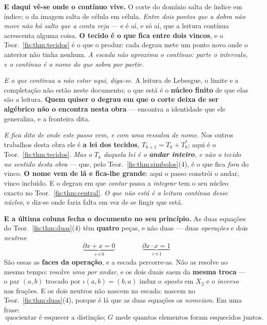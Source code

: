\documentclass[livro.tex]{subfiles}
\begin{document}
\medskip\noindent\textbf{E daqui vê-se onde o contínuo vive.} O corte do domínio
salta de índice em índice; o da imagem salta de célula em célula. \emph{Entre
dois pontos que a dobra não move não há salto que a conta veja} --- e é aí, e só
aí, que a leitura contínua acrescenta alguma coisa. \textbf{O tecido é o que fica
entre dois vincos}, e o Teor.~\ref{fis:thm:tecidos} é o que o produz: cada degrau
mete um ponto novo onde o anterior não tinha nenhum. \emph{A escada não aproxima
o contínuo: parte o intervalo, e o contínuo é o nome do que sobra por partir.}

\medskip\noindent\emph{E o que continua a não estar aqui, diga-se.} A leitura de
Lebesgue, o limite e a completação não estão neste documento; o que está é o
\textbf{núcleo finito} de que elas são a leitura. \textbf{Quem quiser o degrau em
que o corte deixa de ser algébrico não o encontra nesta obra} --- encontra a
identidade que ele generaliza, e a fronteira dita.

\medskip\noindent\emph{E fica dito de onde este passo vem, e com uma ressalva de
nome.} Nos outros trabalhos desta obra ele é \textbf{a lei dos tecidos},
$T_{k+1}=T_k+T_k^{*}$; aqui é o Teor.~\ref{fis:thm:tecidos}. \emph{Mas o $T_k$
daquela lei é o \textbf{andar inteiro}, e não o tecido no sentido desta obra} ---
que, pelo Teor.~\ref{fis:thm:simbolos}(4), é o que fica \emph{fora} do vinco.
\textbf{O nome vem de lá e fica-lhe grande}: aqui o passo constrói o andar, vinco
incluído. E o degrau em
que \emph{contar} passa a \emph{integrar} tem o seu núcleo exacto no
Teor.~\ref{fis:thm:central}. \emph{O que não está é a leitura contínua desse
núcleo}, e diz-se onde faria falta em vez de se fingir que está.

\medskip\noindent\textbf{E a última coluna fecha o documento no seu princípio.}
As duas equações do Teor.~\ref{fis:thm:duas}(4) têm \textbf{quatro} peças, e não duas
--- duas \emph{operações} e dois \emph{neutros}:
\[
\boxed{\;
\underbrace{\partial x+x=0}_{+\ \text{e}\ 0}
\qquad\qquad
\underbrace{\partial x\cdot x=1}_{\times\ \text{e}\ 1}
\;}
\]
São essas as \textbf{faces da operação}, e a escada percorre-as. Não as resolve
ao mesmo tempo: resolve \emph{uma por andar}, e os dois duais saem da
\textbf{mesma troca} --- o par $(a,b)$ trocado por $\iota(a,b)=(b,a)$ induz o
\emph{oposto} em $X_2$ e o \emph{inverso} nas frações. E os dois neutros não
nascem na escada: nascem no Teor.~\ref{fis:thm:duas}(4), porque é lá que as duas
equações os \emph{nomeiam}. Em uma frase:
\[
\boxed{\ \text{quocientar é esquecer a distinção; }G\text{ mede quantos elementos
foram esquecidos juntos.}\ }
\]
\end{document}
